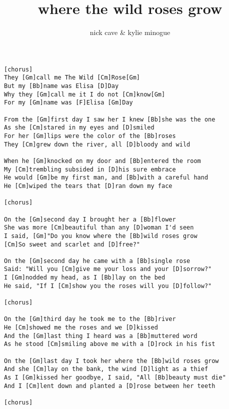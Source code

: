 \author{nick cave \& kylie minogue}
\title{where the wild roses grow}
\maketitle
\begin{verbatim}
[chorus]
They [Gm]call me The Wild [Cm]Rose[Gm]
But my [Bb]name was Elisa [D]Day
Why they [Gm]call me it I do not [Cm]know[Gm]
For my [Gm]name was [F]Elisa [Gm]Day 

From the [Gm]first day I saw her I knew [Bb]she was the one
As she [Cm]stared in my eyes and [D]smiled
For her [Gm]lips were the color of the [Bb]roses
They [Cm]grew down the river, all [D]bloody and wild 

When he [Gm]knocked on my door and [Bb]entered the room
My [Cm]trembling subsided in [D]his sure embrace
He would [Gm]be my first man, and [Bb]with a careful hand
He [Cm]wiped the tears that [D]ran down my face 

[chorus]

On the [Gm]second day I brought her a [Bb]flower
She was more [Cm]beautiful than any [D]woman I'd seen
I said, [Gm]"Do you know where the [Bb]wild roses grow
[Cm]So sweet and scarlet and [D]free?" 

On the [Gm]second day he came with a [Bb]single rose
Said: "Will you [Cm]give me your loss and your [D]sorrow?"
I [Gm]nodded my head, as I [Bb]lay on the bed
He said, "If I [Cm]show you the roses will you [D]follow?" 

[chorus]

On the [Gm]third day he took me to the [Bb]river
He [Cm]showed me the roses and we [D]kissed
And the [Gm]last thing I heard was a [Bb]muttered word
As he stood [Cm]smiling above me with a [D]rock in his fist 

On the [Gm]last day I took her where the [Bb]wild roses grow
And she [Cm]lay on the bank, the wind [D]light as a thief
As I [Gm]kissed her goodbye, I said, "All [Bb]beauty must die"
And I [Cm]lent down and planted a [D]rose between her teeth 

[chorus]
\end{verbatim}